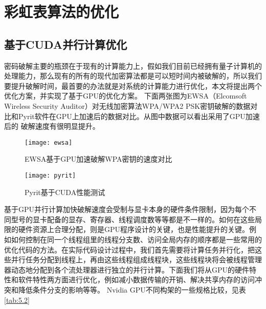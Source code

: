 \chapter{彩虹表算法的优化}
\section{基于CUDA并行计算优化}
密码破解主要的瓶颈在于现有的计算能力上，假如我们目前已经拥有量子计算机的处理能力，那么现有的所有的现代加密算法都是可以短时间内被破解的，所以我们要提升破解时间，最首要的办法就是对系统的计算能力进行优化，本文将提出两个优化方案，并实现了基于GPU的优化方案。
下面两张图为EWSA（Elcomsoft Wireless Security Auditor）对无线加密算法WPA/WPA2 PSK密钥破解的数据对比和Pyrit软件在GPU上加速后的数据对比。从图中数据可以看出采用了GPU加速后的
破解速度有很明显提升。
\begin{figure}[!ht]
\centering
\texttt{[image: ewsa]}
\caption{EWSA基于GPU加速破解WPA密钥的速度对比}
\end{figure}
\begin{figure}[!ht]
\centering
\texttt{[image: pyrit]}
\caption{Pyrit基于CUDA性能测试}
\end{figure}
基于GPU并行计算加快破解速度会受制与显卡本身的硬件条件限制，因为每个不同型号的显卡配备的显存、寄存器、线程调度数等等都是不一样的。如何在这些局限的硬件资源上合理分配，则是GPU程序设计的关键，也是性能提升的关键。例如如何控制在同一个线程组里的线程分支数、访问全局内存的顺序都是一些常用的优化代码的方法。在实际代码设计过程中，我们首先需要将计算任务并行化，把这些并行任务分配到线程上，再由这些线程组成线程块，这些线程块将会被线程管理器动态地分配到各个流处理器进行独立的并行计算。下面我们将从GPU的硬件特性和软件特性两方面进行优化，例如减小数据传输的开销、解决共享内存的访问冲突和降低条件分支的影响等等\cite{cuda01}。
Nvidia GPU不同构架的一些规格比较，见表\ref{tab:5.2}
